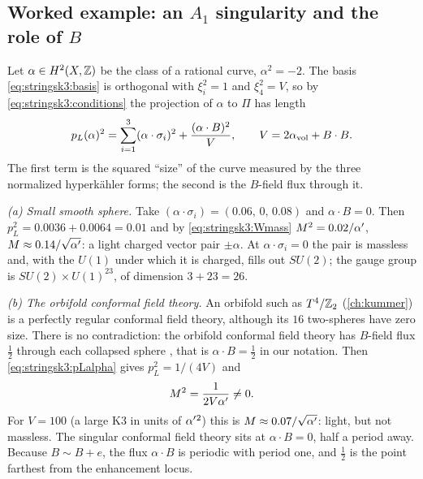 \subsection{Worked example: an \texorpdfstring{$A_1$}{A1} singularity and the role of
\texorpdfstring{$B$}{B}}\label{sec:stringsk3:A1}
Let $\alpha\in H^2(X,\mathbb{Z})$ be the class of a rational curve, $\alpha^2=-2$. The basis
\eqref{eq:stringsk3:basis} is orthogonal with $\xi_i^2=1$ and $\xi_4^2=V$, so by
\eqref{eq:stringsk3:conditions} the projection of $\alpha$ to $\Pi$ has length
\begin{equation}\label{eq:stringsk3:pLalpha}
  p_L(\alpha)^2=\sum_{i=1}^3(\alpha\cdot\sigma_i)^2+\frac{(\alpha\cdot B)^2}{V},
  \qquad V=2\alpha_{\rm vol}+B\cdot B .
\end{equation}
The first term is the squared
``size'' of the curve measured by the three normalized hyperk\"ahler forms; the second is the
$B$-field flux through it.

\emph{(a) Small smooth sphere.} Take $(\alpha\cdot\sigma_i)=(0.06,\,0,\,0.08)$ and
$\alpha\cdot B=0$. Then $p_L^2=0.0036+0.0064=0.01$ and by \eqref{eq:stringsk3:Wmass}
$M^2=0.02/\alpha'$, $M\approx0.14/\sqrt{\alpha'}$: a light charged vector pair $\pm\alpha$. At
$\alpha\cdot\sigma_i=0$ the pair is massless and, with the $U(1)$ under which it is charged,
fills out $SU(2)$; the gauge group is $SU(2)\times U(1)^{23}$, of dimension $3+23=26$.

\emph{(b) The orbifold conformal field theory.} An orbifold such as $T^4/\mathbb{Z}_2$
(\cref{ch:kummer}) is a perfectly regular conformal field theory, although its $16$ two-spheres
have zero size. There is no contradiction: the orbifold conformal field theory has
$B$-field flux $\tfrac12$ through each collapsed sphere
, that is $\alpha\cdot B=\tfrac12$ in our notation. Then
\eqref{eq:stringsk3:pLalpha} gives $p_L^2=1/(4V)$ and
\begin{equation}
  M^2=\frac{1}{2V\alpha'}\neq0 .
\end{equation}
For $V=100$ (a large K3 in units of $\alpha'{}^2$) this is $M\approx0.07/\sqrt{\alpha'}$: light, but not
massless. The singular conformal field theory sits at $\alpha\cdot B=0$, half a period away.
Because $B\sim B+e$, the flux $\alpha\cdot B$ is periodic with period one, and $\tfrac12$ is the
point farthest from the enhancement locus.

